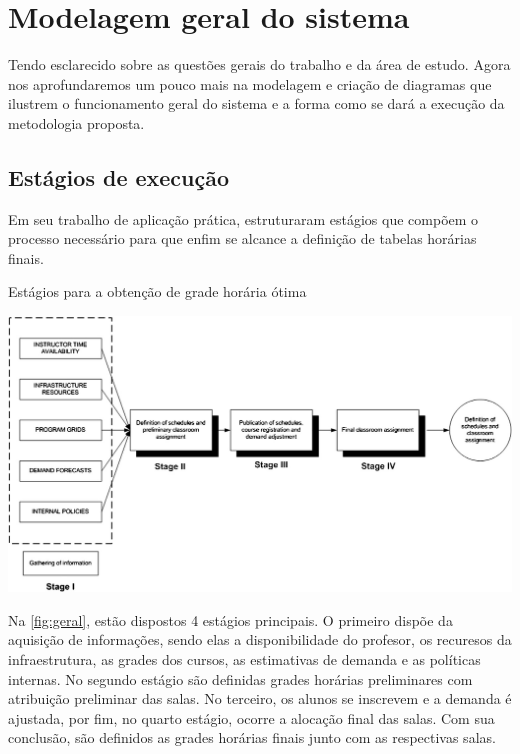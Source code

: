 \chapter{Modelagem geral do sistema} \label{chap:modelagem} %

Tendo esclarecido sobre as questões gerais do trabalho e da área de estudo. Agora nos aprofundaremos um pouco mais na modelagem e criação de diagramas que ilustrem o funcionamento geral do sistema e a forma como se dará a execução da metodologia proposta.

\section{Estágios de execução} \label{sec:estagios} %

Em seu trabalho de aplicação prática,  estruturaram estágios que compõem o processo necessário para que enfim se alcance a definição de tabelas horárias finais.

\begin{CenteredFigure}
  \caption{Estágios para a obtenção de grade horária ótima}
  \label{fig:geral}
  \includegraphics[width=\textwidth]{files/img/2.02!4-modelagem/Arquitetura-UDP}
\end{CenteredFigure}

Na \autoref{fig:geral}, estão dispostos 4 estágios principais. O primeiro dispõe da aquisição de informações, sendo elas a disponibilidade do profesor, os recuresos da infraestrutura, as grades dos cursos, as estimativas de demanda e as políticas internas. No segundo estágio são definidas grades horárias preliminares com atribuição preliminar das salas. No terceiro, os alunos se inscrevem e a demanda é ajustada, por fim, no quarto estágio, ocorre a alocação final das salas. Com sua conclusão, são definidos as grades horárias finais junto com as respectivas salas.

